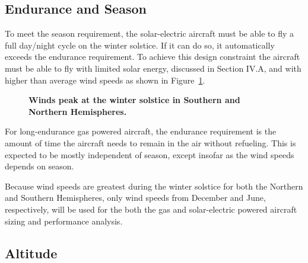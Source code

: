 \subsection{Endurance and Season}

To meet the season requirement, the solar-electric aircraft must be able to fly a full day/night cycle on the winter solstice.  
If it can do so, it automatically exceeds the endurance requirement. 
To achieve this design constraint the aircraft must be able to fly with limited solar energy, discussed in Section IV.A, and with higher than average wind speeds as shown in Figure~\ref{f:windvsmonth}.  

\begin{figure}[H]
 \begin{subfigmatrix}{2}%
 \end{subfigmatrix}
 \caption{\textbf{Winds peak at the winter solstice in Southern and Northern Hemispheres.\cite{wind}}}
 \label{f:windvsmonth}
\end{figure}

For long-endurance gas powered aircraft, the endurance requirement is the amount of time the aircraft needs to remain in the air without refueling.  
This is expected to be mostly independent of season, except insofar as the wind speeds depends on season. 

Because wind speeds are greatest during the winter solstice for both the Northern and Southern Hemispheres, only wind speeds from December and June, respectively, will be used for the both the gas and solar-electric powered aircraft sizing and performance analysis. 


\subsection{Altitude}

